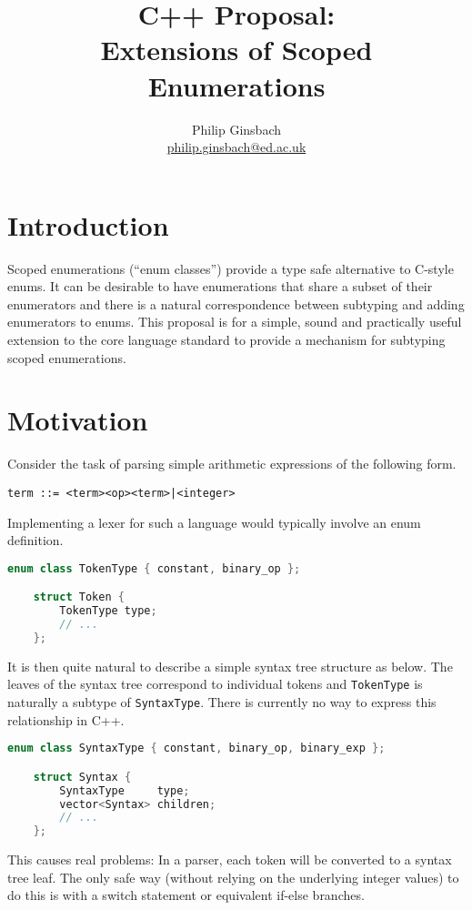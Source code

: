 \documentclass{scrartcl}
\author{Philip Ginsbach\\\url{philip.ginsbach@ed.ac.uk}}
\title{C++ Proposal:\\Extensions of Scoped Enumerations}
\begin{document}
\maketitle
\section*{Introduction}
Scoped enumerations (``enum classes'') provide a type safe alternative to C-style enums.
It can be desirable to have enumerations that share a subset of their enumerators and there is a natural correspondence between subtyping and adding enumerators to enums.
This proposal is for a simple, sound and practically useful extension to the core language standard to provide a mechanism for subtyping scoped enumerations.

\section*{Motivation}
Consider the task of parsing simple arithmetic expressions of the following form.

\begin{lstlisting}[language={}]
     term ::= <term><op><term>|<integer>
\end{lstlisting}

\noindent
Implementing a lexer for such a language would typically involve an enum definition.

{\footnotesize
\begin{lstlisting}[language=C++]
    enum class TokenType { constant, binary_op };

    struct Token {
        TokenType type;
        // ...
    };
\end{lstlisting} }

\noindent
It is then quite natural to describe a simple syntax tree structure as below.
The leaves of the syntax tree correspond to individual tokens and \texttt{TokenType} is naturally a subtype of \texttt{SyntaxType}.
There is currently no way to express this relationship in C++.

{\footnotesize
\begin{lstlisting}[language=C++]
    enum class SyntaxType { constant, binary_op, binary_exp };

    struct Syntax {
        SyntaxType     type;
        vector<Syntax> children;
        // ...
    };
\end{lstlisting}}

This causes real problems: In a parser, each token will be converted to a syntax tree leaf.
The only safe way (without relying on the underlying integer values) to do this is with a switch statement or equivalent if-else branches.
\end{document}
